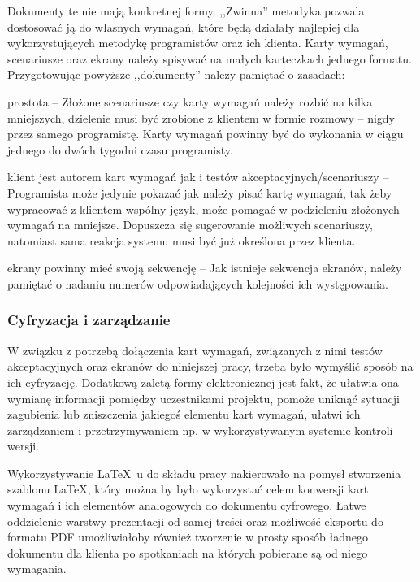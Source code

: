Dokumenty te nie mają konkretnej formy. ,,Zwinna'' metodyka pozwala dostosować ją do własnych wymagań, które będą działały najlepiej dla wykorzystujących metodykę programistów oraz ich klienta. Karty wymagań, scenariusze oraz ekrany należy spisywać na małych karteczkach jednego formatu. Przygotowując powyższe ,,dokumenty'' należy pamiętać o zasadach:
\begin{packed_item}
    \item prostota -- Złożone scenariusze czy karty wymagań należy rozbić na kilka mniejszych, dzielenie musi być zrobione z klientem w formie rozmowy -- nigdy przez samego programistę. Karty wymagań powinny być do wykonania w ciągu jednego do dwóch tygodni czasu programisty.
    \item klient jest autorem kart wymagań jak i testów akceptacyjnych/scenariuszy -- Programista może jedynie pokazać jak należy pisać kartę wymagań, tak żeby wypracować z klientem wspólny język, może pomagać w podzieleniu złożonych wymagań na mniejsze. Dopuszcza się sugerowanie możliwych scenariuszy, natomiast sama reakcja systemu musi być już określona przez klienta.
    \item ekrany powinny mieć swoją sekwencję -- Jak istnieje sekwencja ekranów, należy pamiętać o nadaniu numerów odpowiadających kolejności ich występowania.
\end{packed_item}

\subsubsection{Cyfryzacja i zarządzanie}
\label{sec:ZSWcyfryzacja}

W związku z potrzebą dołączenia kart wymagań, związanych z nimi testów akceptacyjnych oraz ekranów do niniejszej pracy, trzeba było wymyślić sposób na ich cyfryzację. Dodatkową zaletą formy elektronicznej jest fakt, że ułatwia ona wymianę informacji pomiędzy uczestnikami projektu, pomoże uniknąć sytuacji zagubienia lub zniszczenia jakiegoś elementu kart wymagań, ułatwi ich zarządzaniem i przetrzymywaniem np. w wykorzystywanym systemie kontroli wersji.

Wykorzystywanie \LaTeX~u do składu pracy nakierowało na pomysł stworzenia szablonu \LaTeX, który można by było wykorzystać celem konwersji kart wymagań i ich elementów analogowych do dokumentu cyfrowego. Łatwe oddzielenie warstwy prezentacji od samej treści oraz możliwość eksportu do formatu PDF umożliwiałoby również tworzenie w prosty sposób ładnego dokumentu dla klienta po spotkaniach na których pobierane są od niego wymagania.

